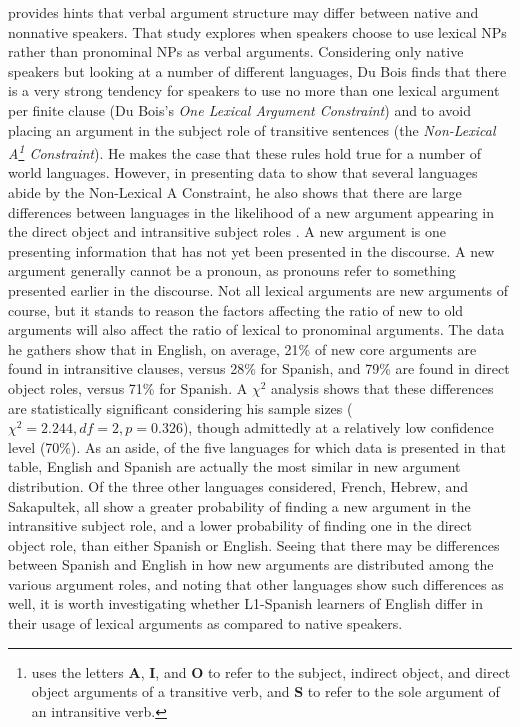 \documentclass[main.tex]{subfiles}
\begin{document}
\citet{dubois:2003} provides hints that verbal argument structure may differ between native and nonnative speakers. That study explores when speakers choose to use lexical NPs rather than pronominal NPs as verbal arguments. Considering only native speakers but looking at a number of different languages, Du Bois finds that there is a very strong tendency for speakers to use no more than one lexical argument per finite clause (Du Bois's \textit{One Lexical Argument Constraint}) and to avoid placing an argument in the subject role of transitive sentences (the \textit{Non-Lexical A\footnote{\citet{dubois:2003} uses the letters \textbf{A}, \textbf{I}, and \textbf{O} to refer to the subject, indirect object, and direct object arguments of a transitive verb, and \textbf{S} to refer to the sole argument of an intransitive verb.} Constraint}). He makes the case that these rules hold true for a number of world languages. However, in presenting data to show that several languages abide by the Non-Lexical A Constraint, he also shows that there are large differences between languages in the likelihood of a new argument appearing in the direct object and intransitive subject roles \citep[Table~2.5]{dubois:2003}. A new argument is one presenting information that has not yet been presented in the discourse. A new argument generally cannot be a pronoun, as pronouns refer to something presented earlier in the discourse. Not all lexical arguments are new arguments of course, but it stands to reason the factors affecting the ratio of new to old arguments will also affect the ratio of lexical to pronominal arguments. The data he gathers show that in English, on average, 21\% of new core arguments are found in intransitive clauses, versus 28\% for Spanish, and 79\% are found in direct object roles, versus 71\% for Spanish. A $\chi^2$ analysis shows that these differences are statistically significant considering his sample sizes ($\chi^2=2.244, df=2, p=0.326$), though admittedly at a relatively low confidence level (70\%). As an aside, of the five languages for which data is presented in that table, English and Spanish are actually the most similar in new argument distribution. Of the three other languages considered, French, Hebrew, and Sakapultek, all show a greater probability of finding a new argument in the intransitive subject role, and a lower probability of finding one in the direct object role, than either Spanish or English. Seeing that there may be differences between Spanish and English in how new arguments are distributed among the various argument roles, and noting that other languages show such differences as well, it is worth investigating whether L1-Spanish learners of English differ in their usage of lexical arguments as compared to native speakers.
\end{document}

